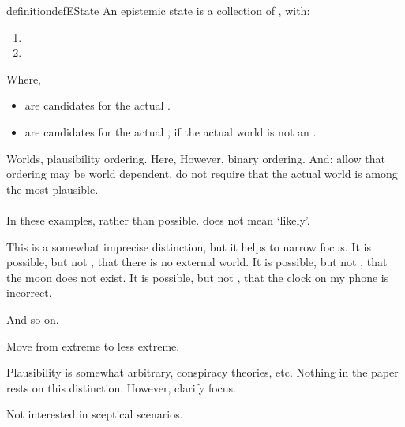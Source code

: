 \begin{note}
  \begin{restatable}{definition}{defEState}
    An epistemic state is a collection of , with:
    \begin{enumerate}
    \item {} 
    \item {} 
    \end{enumerate}
    Where,
    \begin{itemize}
    \item {}  are candidates for the actual \world{}.
    \item {}  are candidates for the actual \world{}, if the actual world is not an  .
    \end{itemize}
  \end{restatable}
\end{note}

\begin{note}
  Worlds, plausibility ordering.
  Here, 
  However, binary ordering.
  And:
  allow that ordering may be world dependent.
  do not require that the actual world is among the most plausible.
\end{note}

\paragraph{}

\begin{note}
  In these examples,  rather than possible.
   does not mean `likely'.

  This is a somewhat imprecise distinction, but it helps to narrow focus.
  It is possible, but not , that there is no external world.
  It is possible, but not , that the moon does not exist.
  It is possible, but not , that the clock on my phone is incorrect.

  And so on.

  Move from extreme to less extreme.

  Plausibility is somewhat arbitrary, conspiracy theories, etc.
  Nothing in the paper rests on this distinction.
  However, clarify focus.
\end{note}

\begin{note}
  Not interested in sceptical scenarios.
\end{note}

